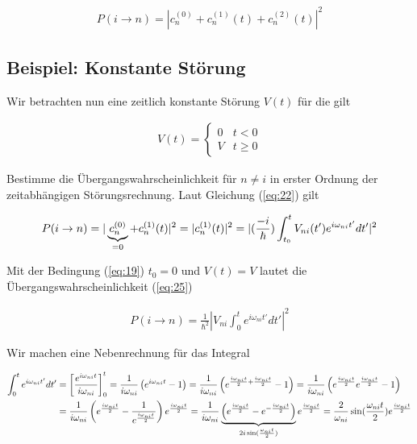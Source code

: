 \begin{align}
  \label{eq:22}
  \boxed{P(i\rightarrow n) = |c^{(0)}_n + c_n^{(1)}(t)+c_n^{(2)}(t)|^2}
\end{align}

\subsection*{Beispiel: Konstante Störung}

Wir betrachten nun eine zeitlich konstante Störung \(V(t)\) für die gilt

\begin{align}
  \label{eq:19}
  V(t) =\begin{cases}0& t<0\\ V&t\ge 0    \end{cases}
\end{align}

Bestimme die Übergangswahrscheinlichkeit für \(n \ne i\) in erster Ordnung der zeitabhängigen Störungsrechnung. Laut Gleichung (\ref{eq:22}) gilt

\begin{align}
  \label{eq:25}
  P(i\rightarrow n) = |\underbr{c^{(0)}_n}_{=0} + c_n^{(1)}(t)|^2 = |c_n^{(1)}(t)|^2 = |(\frac{-i}{\hbar})\int_{t_0}^t V_{ni}(t')e^{i\omega_{ni}t'}dt'|^2
\end{align}

Mit der Bedingung (\ref{eq:19}) \(t_0=0\) und \(V(t)=V\) lautet die Übergangswahrscheinlichkeit (\ref{eq:25})

\begin{align}
  \label{eq:26}
  P(i\rightarrow n) = \frac{1}{\hbar^2}| V_{ni} \int_{0}^t e^{i\omega_{ni}t'}dt'|^2
\end{align}

Wir machen eine Nebenrechnung für das Integral

\begin{align}
  \label{eq:27}
  \int_{0}^t e^{i\omega_{ni}t'}dt' &= \left[ \frac{e^{i\omega_{ni} t}}{i\omega_{ni}}  \right]_0^t = \frac{1}{i\omega_{ni}}\left( e^{i\omega_{ni} t}-1 \right) = \frac{1}{i\omega_{ni}}\left( e^{\frac{i\omega_{ni} t}{2}+\frac{i\omega_{ni} t}{2}}-1 \right) =  \frac{1}{i\omega_{ni}}\left( e^{\frac{i\omega_{ni} t}{2}}e^{\frac{i\omega_{ni} t}{2}}-1 \right) \notag \\
&=  \frac{1}{i\omega_{ni}}\left( e^{\frac{i\omega_{ni} t}{2}}-\frac{1}{e^{\frac{i\omega_{ni} t}{2}}} \right)e^{\frac{i\omega_{ni} t}{2}} = \frac{1}{i\omega_{ni}} \underbr{\left( e^{\frac{i\omega_{ni} t}{2}}-e^{-\frac{i\omega_{ni} t}{2}}\right)}_{2i\sin(\frac{\omega_{ni} t}{2})} e^{\frac{i\omega_{ni} t}{2}} = \frac{2}{\omega_{ni}}\sin(\frac{\omega_{ni} t}{2})e^{\frac{i\omega_{ni} t}{2}}
\end{align}

